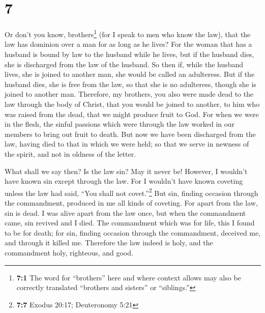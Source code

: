 \hypertarget{section-6}{%
\section{7}\label{section-6}}

 Or don't you know, brothers\footnote{\textbf{7:1} The
  word for ``brothers'' here and where context allows may also be
  correctly translated ``brothers and sisters'' or ``siblings.''} (for I
speak to men who know the law), that the law has dominion over a man for
as long as he lives?  For the woman that has a husband is
bound by law to the husband while he lives, but if the husband dies, she
is discharged from the law of the husband.  So then if,
while the husband lives, she is joined to another man, she would be
called an adulteress. But if the husband dies, she is free from the law,
so that she is no adulteress, though she is joined to another man.
 Therefore, my brothers, you also were made dead to the
law through the body of Christ, that you would be joined to another, to
him who was raised from the dead, that we might produce fruit to God.
 For when we were in the flesh, the sinful passions which
were through the law worked in our members to bring out fruit to death.
 But now we have been discharged from the law, having died
to that in which we were held; so that we serve in newness of the
spirit, and not in oldness of the letter.

 What shall we say then? Is the law sin? May it never be!
However, I wouldn't have known sin except through the law. For I
wouldn't have known coveting unless the law had said, ``You shall not
covet.''\footnote{\textbf{7:7} Exodus 20:17; Deuteronomy 5:21}
 But sin, finding occasion through the commandment,
produced in me all kinds of coveting. For apart from the law, sin is
dead.  I was alive apart from the law once, but when the
commandment came, sin revived and I died.  The
commandment which was for life, this I found to be for death;
 for sin, finding occasion through the commandment,
deceived me, and through it killed me.  Therefore the law
indeed is holy, and the commandment holy, righteous, and good.

